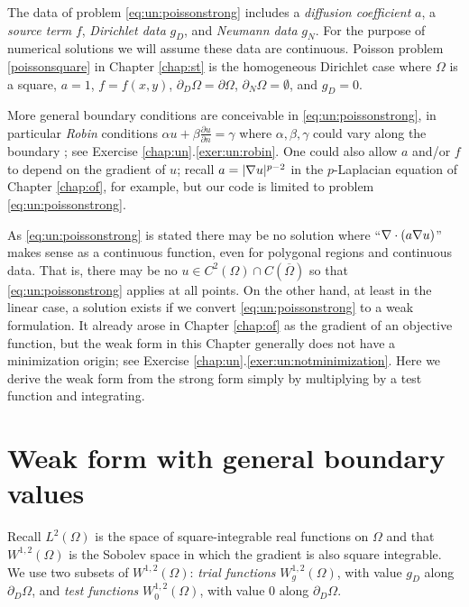 The data of problem \eqref{eq:un:poissonstrong} includes a \emph{diffusion coefficient} $a$, a \emph{source term} $f$, \emph{Dirichlet data} $g_D$, and \emph{Neumann data} $g_N$.  For the purpose of numerical solutions we will assume these data are continuous.  Poisson problem \eqref{poissonsquare} in Chapter \ref{chap:st} is the homogeneous Dirichlet case where $\Omega$ is a square, $a = 1$, $f=f(x,y)$, $\partial_D \Omega = \partial \Omega$, $\partial_N \Omega = \emptyset$, and $g_D=0$.

More general boundary conditions are conceivable in \eqref{eq:un:poissonstrong}, in particular \emph{Robin} conditions $\alpha u + \beta \frac{\partial u}{\partial n} = \gamma$ where $\alpha,\beta,\gamma$ could vary along the boundary \citep{Elmanetal2005}; see Exercise \ref{chap:un}.\ref{exer:un:robin}.  One could also allow $a$ and/or $f$ to depend on the gradient of $u$; recall $a=|\nabla u|^{p-2}$ in the $p$-Laplacian equation of Chapter \ref{chap:of}, for example, but our code is limited to problem \eqref{eq:un:poissonstrong}.

As \eqref{eq:un:poissonstrong} is stated there may be no solution where ``$\nabla\cdot(a\nabla u)$'' makes sense as a continuous function, even for polygonal regions and continuous data.  That is, there may be no $u\in C^2(\Omega) \cap C(\overline \Omega)$ so that \eqref{eq:un:poissonstrong} applies at all points.  On the other hand, at least in the linear case, a solution exists if we convert \eqref{eq:un:poissonstrong} to a weak formulation.  It already arose in Chapter \ref{chap:of} as the gradient of an objective function, but the weak form in this Chapter generally does not have a minimization origin; see Exercise \ref{chap:un}.\ref{exer:un:notminimization}.  Here we derive the weak form from the strong form simply by multiplying by a test function and integrating.


\section{Weak form with general boundary values}

Recall $L^2(\Omega)$ is the space of square-integrable real functions on $\Omega$ and that $W^{1,2}(\Omega)$ is the Sobolev space in which the gradient is also square integrable.  We use two subsets of $W^{1,2}(\Omega)$: \emph{trial functions} $W^{1,2}_g(\Omega)$, with value $g_D$ along $\partial_D \Omega$, and \emph{test functions} $W^{1,2}_0(\Omega)$, with value $0$ along $\partial_D \Omega$.

